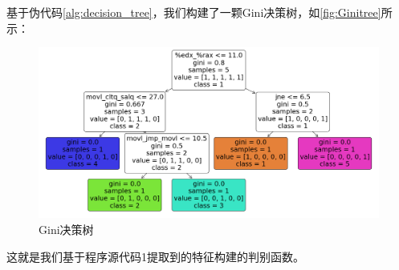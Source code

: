 基于伪代码\autoref{alg:decision_tree}，我们构建了一颗Gini决策树，如\autoref{fig:Ginitree}所示：
\begin{figure}[H]
    \centering
    \includegraphics[width=1\linewidth]{figures/Ginitree.png}
    \caption{Gini决策树}
    \label{fig:Ginitree}
\end{figure}
这就是我们基于程序源代码1提取到的特征构建的判别函数。
